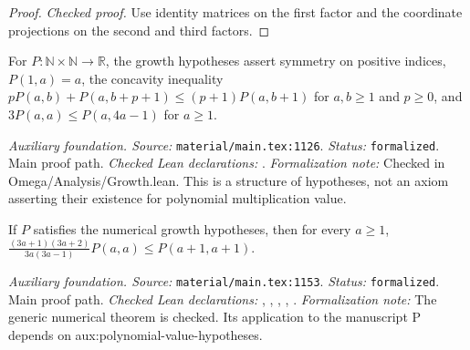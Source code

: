\begin{proof}
\leanok
{}
\textit{Checked proof.} Use identity matrices on the first factor and the coordinate projections on the second and third factors.
\end{proof}

\renewcommand{\thetheorem}{A18}
\begin{definition}
\label{aux:numerical-growth-hypotheses}
\leanok
For $P:\mathbb N\times\mathbb N\to\mathbb R$, the growth hypotheses assert symmetry on positive indices, $P(1,a)=a$, the concavity inequality $pP(a,b)+P(a,b+p+1)\le(p+1)P(a,b+1)$ for $a,b\ge1$ and $p\ge0$, and $3P(a,a)\le P(a,4a-1)$ for $a\ge1$.
\end{definition}

\noindent\textit{Auxiliary foundation. Source:} \texttt{material/main.tex:1126}.
\textit{Status:} \texttt{formalized}. Main proof path.
\textit{Checked Lean declarations:} .
\textit{Formalization note:} Checked in Omega/Analysis/Growth.lean. This is a structure of hypotheses, not an axiom asserting their existence for polynomial multiplication value.

\renewcommand{\thetheorem}{A19}
\begin{lemma}
\label{aux:numerical-recurrence}
\leanok
If $P$ satisfies the numerical growth hypotheses, then for every $a\ge1$, $\frac{(3a+1)(3a+2)}{3a(3a-1)}P(a,a)\le P(a+1,a+1)$.
\end{lemma}

\noindent\textit{Auxiliary foundation. Source:} \texttt{material/main.tex:1153}.
\textit{Status:} \texttt{formalized}. Main proof path.
\textit{Checked Lean declarations:} , , , , .
\textit{Formalization note:} The generic numerical theorem is checked. Its application to the manuscript P depends on aux:polynomial-value-hypotheses.

